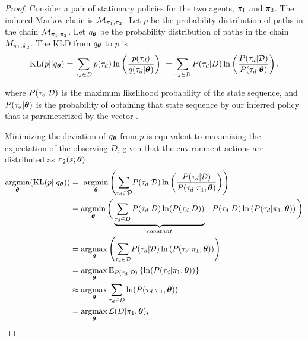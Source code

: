     \begin{proof}
        Consider a pair of stationary policies for the two agents, $\pi_{1}$ and $\pi_{2}$. The induced Markov
        chain is $\mathcal{M}_{\pi_{1}, \pi_{2}}$. Let $p$ be the probability distribution of paths in the chain
        $\mathcal{M}_{\pi_{1}, \pi_{2}}$. Let $q_{\boldsymbol{\mathbb{\theta}}}$ be the probability distribution of paths in the
        chain $M_{\pi_{1}, \hat{\pi_{}}_2}$. The \ac{KLD} from $q_{\boldsymbol{\mathbb{\theta}}}$ to $p$ is
        \begin{equation*}\label{eq:traj_kl_div}
            \text{KL}(p || q_{\boldsymbol{\mathbb{\theta}}}) = \sum_{\tau_d \in D} p(\tau_d) \ln \left( \frac{p(\tau_d)}
                                                {q(\tau_d|\boldsymbol{\mathbb{\theta}})} \right)\
                                          = \sum_{\tau_d \in \mathcal{D}} P(\tau_d|D) \ln \left( \frac{P(\tau_d|\mathcal{D})}
                                                {P(\tau_d|\boldsymbol{\mathbb{\theta}})} \right),
        \end{equation*}

        \noindent
        where $P(\tau_d|\mathcal{D})$ is the maximum likelihood probability of the state sequence, and
        $P(\tau_d|\boldsymbol{\mathbb{\theta}})$ is the probability of obtaining that state sequence by our inferred policy that is
        parameterized by the vector \paramVec.

        Minimizing the deviation of $q_{\boldsymbol{\mathbb{\theta}}}$ from $p$ is equivalent to maximizing the expectation of the
        observing $D$, given that the environment actions are distributed as $\pi_{2}(s; \boldsymbol{\mathbb{\theta}})$:
        \begin{equation}\label{eq:min_kld}
            \begin{aligned}
                \mathop{\mathrm{argmin}}_{\boldsymbol{\mathbb{\theta}}}(\text{KL}(p || q_{\boldsymbol{\mathbb{\theta}}})) & = \
                    \mathop{\mathrm{argmin}}_{\boldsymbol{\mathbb{\theta}}}\left(\sum_{\tau_d \in  \mathcal{D}}\!  P(\tau_d|\mathcal{D})
                    \ln\left(\frac{P(\tau_d|\mathcal{D})}{P(\tau_d|\pi_{1},\boldsymbol{\mathbb{\theta}})}\right)\right)\\
                & = \mathop{\mathrm{argmin}}_{\boldsymbol{\mathbb{\theta}}}\bigg(\underbrace{\sum_{\tau_d \in D} P(\tau_d|D) \ln(P(\tau_d|D))}_{constant} -
                    P(\tau_d|D) \ln\left(P(\tau_d|\pi_{1},\boldsymbol{\mathbb{\theta}})\right)\bigg)\\
                & = \mathop{\mathrm{argmax}}_{\boldsymbol{\mathbb{\theta}}}\left(\sum_{\tau_d \in \mathcal{D}}\!  P(\tau_d|\mathcal{D})
                    \ln\left(P(\tau_d|\pi_{1},\boldsymbol{\mathbb{\theta}})\right)\right)\\
                & = \mathop{\mathrm{argmax}}_{\boldsymbol{\mathbb{\theta}}}\mathbb{E}_{P(\tau_d|\mathcal{D})}\left\{\ln(P(\tau_d|\pi_{1},\boldsymbol{\mathbb{\theta}}))\right\} \\
                &\approx \mathop{\mathrm{argmax}}_{\boldsymbol{\mathbb{\theta}}} \sum_{\tau_d \in D}  \ln(P(\tau_d|\pi_{1},\boldsymbol{\mathbb{\theta}}))\\
                & =\mathop{\mathrm{argmax}}_{\boldsymbol{\mathbb{\theta}}} \mathcal{L}(D|\pi_{1},\boldsymbol{\mathbb{\theta}}),
            \end{aligned}
        \end{equation}


\end{proof}
